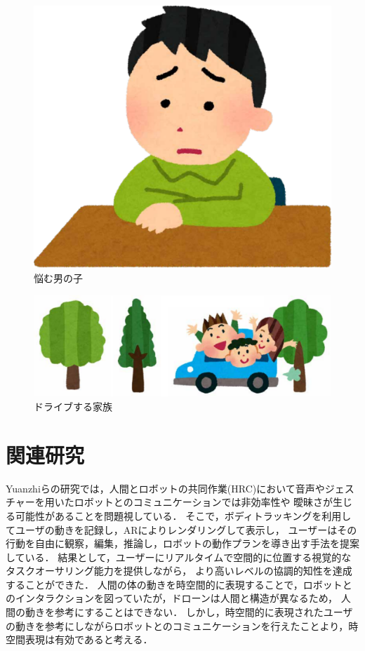 \documentclass[a4paper,10pt,twocolumn,uplatex]{jsarticle}
\begin{document}
\begin{figure}[!tb]
  \centering
  \includegraphics[width=\linewidth]{img/sample1.pdf}
  \caption{悩む男の子}
  \label{fig:sample1}
\end{figure}

\begin{figure}[!tb]
  \centering
  \includegraphics[width=\linewidth]{img/sample2.pdf}
  \caption{ドライブする家族}
  \label{fig:sample2}
\end{figure}


\section{関連研究}\label{discussion}
Yuanzhiらの研究では，人間とロボットの共同作業(HRC)において音声やジェスチャーを用いたロボットとのコミュニケーションでは非効率性や
曖昧さが生じる可能性があることを問題視している．
そこで，ボディトラッキングを利用してユーザの動きを記録し，ARによりレンダリングして表示し，
ユーザーはその行動を自由に観察，編集，推論し，ロボットの動作プランを導き出す手法を提案している\cite{time-space}．
結果として，ユーザーにリアルタイムで空間的に位置する視覚的なタスクオーサリング能力を提供しながら，
より高いレベルの協調的知性を達成することができた．
人間の体の動きを時空間的に表現することで，ロボットとのインタラクションを図っていたが，ドローンは人間と構造が異なるため，
人間の動きを参考にすることはできない．
しかし，時空間的に表現されたユーザの動きを参考にしながらロボットとのコミュニケーションを行えたことより，時空間表現は有効であると考える．
\end{document}
